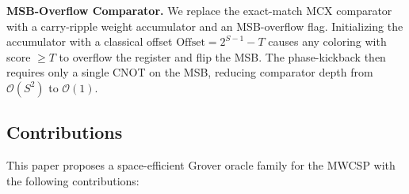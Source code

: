 \documentclass{ieeeaccess}
\begin{document}
\textbf{MSB-Overflow Comparator.} We replace the exact-match MCX
comparator with a carry-ripple weight accumulator and an
MSB-overflow flag. Initializing the accumulator with a classical
offset $\mathrm{Offset} = 2^{S-1} - T$ causes any coloring with
score $\geq T$ to overflow the register and flip the MSB. The
phase-kickback then requires only a single CNOT on the MSB,
reducing comparator depth from $\mathcal{O}(S^2)$ to
$\mathcal{O}(1)$.

\subsection{Contributions}

This paper proposes a space-efficient Grover oracle family for the
MWCSP with the following contributions:
%
\end{document}
